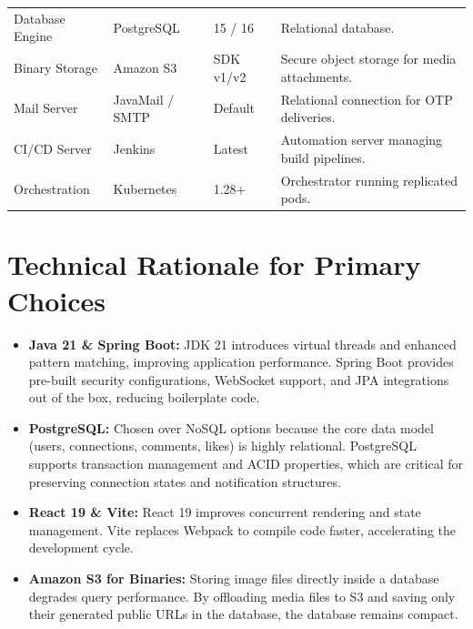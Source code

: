 \begin{table}[H]
\begin{tabularx}{\textwidth}{l X l X}
        Database Engine & PostgreSQL & 15 / 16 & Relational database. \\
        Binary Storage & Amazon S3 & SDK v1/v2 & Secure object storage for media attachments. \\
        Mail Server & JavaMail / SMTP & Default & Relational connection for OTP deliveries. \\
        CI/CD Server & Jenkins & Latest & Automation server managing build pipelines. \\
        Orchestration & Kubernetes & 1.28+ & Orchestrator running replicated pods. \\
        \bottomrule
    \end{tabularx}
\end{table}

\section{Technical Rationale for Primary Choices}
\begin{itemize}
    \item \textbf{Java 21 \& Spring Boot:} JDK 21 introduces virtual threads and enhanced pattern matching, improving application performance. Spring Boot provides pre-built security configurations, WebSocket support, and JPA integrations out of the box, reducing boilerplate code.
    \item \textbf{PostgreSQL:} Chosen over NoSQL options because the core data model (users, connections, comments, likes) is highly relational. PostgreSQL supports transaction management and ACID properties, which are critical for preserving connection states and notification structures.
    \item \textbf{React 19 \& Vite:} React 19 improves concurrent rendering and state management. Vite replaces Webpack to compile code faster, accelerating the development cycle.
    \item \textbf{Amazon S3 for Binaries:} Storing image files directly inside a database degrades query performance. By offloading media files to S3 and saving only their generated public URLs in the database, the database remains compact.
\end{itemize}
